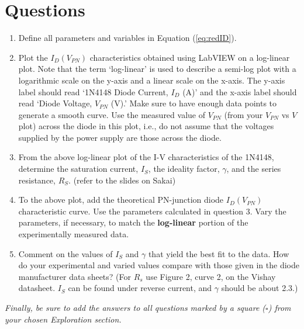 \documentclass[12pt]{../manual}
\begin{document}
\newpage
\section{Questions}
\begin{enumerate}
\item Define all parameters and variables in Equation (\ref{eq:redID}).
\item Plot the $I_D(V_{PN})$ characteristics obtained using LabVIEW on a log-linear plot. Note that the term `log-linear' is used to describe a semi-log plot with a logarithmic scale on the y-axis and a linear scale on the x-axis. The y-axis label should read `1N4148 Diode Current, $I_D$ (A)' and the x-axis label should read `Diode Voltage, $V_{PN}$ (V).' Make sure to have enough data points to generate a smooth curve. Use the measured value of $V_{PN}$ (from your $V_{PN}$ vs $V$ plot) across the diode in this plot, i.e., do not assume that the voltages supplied by the power supply are those across the diode.
\item From the above log-linear plot of the I-V characteristics of the 1N4148, determine the saturation current, $I_S$, the ideality factor, $\gamma$, and the series resistance, $R_S$. (refer to the slides on Sakai)
\item To the above plot, add the theoretical PN-junction diode $I_D(V_{PN})$ characteristic curve. Use the parameters calculated in question 3. Vary the parameters, if necessary, to match the \textbf{log-linear} portion of the experimentally measured data.
\item Comment on the values of $I_S$ and $\gamma$ that yield the best fit to the data. How do your experimental and varied values compare with those given in the diode manufacturer data sheets? (For $R_s$ use Figure 2, curve 2, on the Vishay datasheet. $I_S$ can be found under reverse current, and $\gamma$ should be about 2.3.)
\end{enumerate}
\textit{Finally, be sure to add the answers to all questions marked by a square ($\square$) from your chosen Exploration section.}

\newpage
{} %
\end{document}
